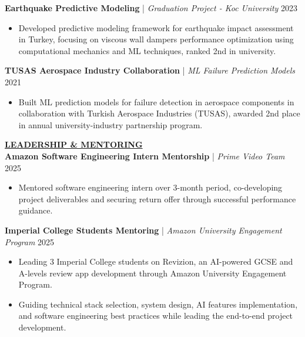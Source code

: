 \documentclass{article}
\newlength{\remaining}
\renewcommand{\section}[1]{
  \vspace{1.0em}\setlength{\remaining}{\textwidth-\widthof{\uppercase{#1}}}
    \noindent\underline{\fontsize{10}{15}\bfseries\uppercase{#1}\hspace*{\remaining}} \\
}
\renewcommand{\subsection}[3]{
    \noindent\textbf{#1} | \emph{#2} \hfill #3  
}
\begin{document}
    \subsection{Earthquake Predictive Modeling}{Graduation Project - Koc University}{2023}
    \begin{itemize}
        \item Developed predictive modeling framework for earthquake impact assessment in Turkey, focusing on viscous wall dampers performance optimization using computational mechanics and ML techniques, ranked 2nd in university.
    \end{itemize}

    \subsection{TUSAS Aerospace Industry Collaboration}{ML Failure Prediction Models}{2021}
    \begin{itemize}
        \item Built ML prediction models for failure detection in aerospace components in collaboration with Turkish Aerospace Industries (TUSAS), awarded 2nd place in annual university-industry partnership program.
    \end{itemize}


\section{Leadership \& Mentoring}
\subsection{Amazon Software Engineering Intern Mentorship}{Prime Video Team}{2025}
\begin{itemize}
    \item Mentored software engineering intern over 3-month period, co-developing project deliverables and securing return offer through successful performance guidance.
\end{itemize}

\subsection{Imperial College Students Mentoring}{Amazon University Engagement Program}{2025}
\begin{itemize}
    \item Leading 3 Imperial College students on Revizion, an AI-powered GCSE and A-levels review app development through Amazon University Engagement Program.
    \item Guiding technical stack selection, system design, AI features implementation, and software engineering best practices while leading the end-to-end project development.
\end{itemize}
\end{document}
